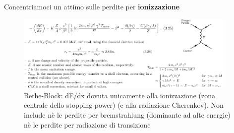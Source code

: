 Concentriamoci un attimo sulle perdite per \textbf{ionizzazione}

\begin{figure}[H]
    \centering
    \includegraphics[width=0.95\textwidth,frame]{Chapters/images/Interazione_radiazione_materia/image-20220214173007634.png}
    \captionsetup{width=0.95\linewidth}
    \caption{Bethe-Block: dE/dx dovuta unicamente alla ionizzazione (zona centrale dello stopping power) (e alla radiazione Cherenkov). Non include nè le perdite per bremstrahlung (dominante ad alte energie) nè le perdite per radiazione di transizione}
    \label{fig:betheformula}
\end{figure}





